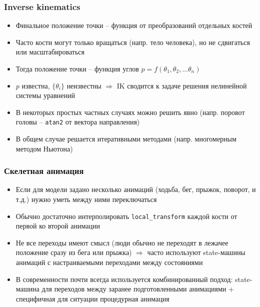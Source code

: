 \documentclass{beamer}
\begin{document}
\begin{frame}[fragile]
\frametitle{Inverse kinematics}
\begin{itemize}
\item Финальное положение точки -- функция от преобразований отдельных костей
\pause
\item Часто кости могут только вращаться (напр. тело человека), но не сдвигаться или масштабироваться
\pause
\item Тогда положение точки -- функция углов \begin{math}p = f(\theta_1, \theta_2, \dots \theta_n)\end{math}
\pause
\item \begin{math}p\end{math} известна, \begin{math}\{\theta_i\}\end{math} неизвестны \begin{math}\Rightarrow\end{math} IK сводится к задаче решения нелинейной системы уравнений
\pause
\item В некоторых простых частных случаях можно решить явно (напр. поровот головы -- \verb|atan2| от вектора направления)
\pause
\item В общем случае решается итеративными методами (напр. многомерным методом Ньютона)
\end{itemize}
\end{frame}

\begin{frame}[fragile]
\frametitle{Скелетная анимация}
\begin{itemize}
\item Если для модели задано несколько анимаций (ходьба, бег, прыжок, поворот, и т.д.) нужно уметь между ними переключаться
\pause
\item Обычно достаточно интерполировать \verb|local_transform| каждой кости от первой ко второй анимации
\pause
\item Не все переходы имеют смысл (люди обычно не переходят в лежачее положение сразу из бега или прыжка) \begin{math}\Rightarrow\end{math} часто используют state-машины анимаций с настраиваемыми переходами между состояниями
\pause
\item В современности почти всегда используется комбинированный подход: state-машина для переходов между заранее подготовленными анимациями + специфичная для ситуации процедурная анимация
\end{itemize}
\end{frame}
\end{document}
